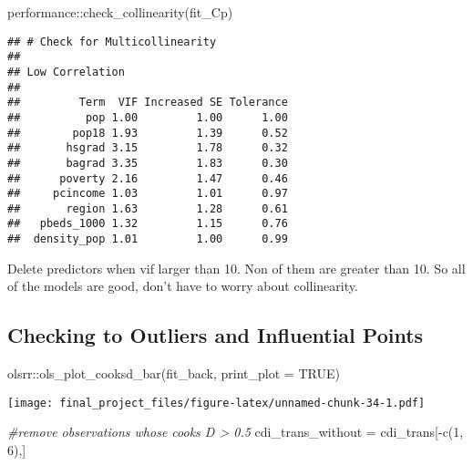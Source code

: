 \documentclass[
]{article}
\newenvironment{Shaded}{\begin{snugshade}}{\end{snugshade}}
\newcommand{\AttributeTok}[1]{\textcolor[rgb]{0.77,0.63,0.00}{#1}}
\newcommand{\CommentTok}[1]{\textcolor[rgb]{0.56,0.35,0.01}{\textit{#1}}}
\newcommand{\ConstantTok}[1]{\textcolor[rgb]{0.00,0.00,0.00}{#1}}
\newcommand{\DecValTok}[1]{\textcolor[rgb]{0.00,0.00,0.81}{#1}}
\newcommand{\FunctionTok}[1]{\textcolor[rgb]{0.00,0.00,0.00}{#1}}
\newcommand{\NormalTok}[1]{#1}
\newcommand{\OtherTok}[1]{\textcolor[rgb]{0.56,0.35,0.01}{#1}}
\newcommand{\SpecialCharTok}[1]{\textcolor[rgb]{0.00,0.00,0.00}{#1}}
\begin{document}
\begin{Shaded}
\begin{Highlighting}[]
\NormalTok{performance}\SpecialCharTok{::}\FunctionTok{check\_collinearity}\NormalTok{(fit\_Cp)}
\end{Highlighting}
\end{Shaded}

\begin{verbatim}
## # Check for Multicollinearity
## 
## Low Correlation
## 
##         Term  VIF Increased SE Tolerance
##          pop 1.00         1.00      1.00
##        pop18 1.93         1.39      0.52
##       hsgrad 3.15         1.78      0.32
##       bagrad 3.35         1.83      0.30
##      poverty 2.16         1.47      0.46
##     pcincome 1.03         1.01      0.97
##       region 1.63         1.28      0.61
##   pbeds_1000 1.32         1.15      0.76
##  density_pop 1.01         1.00      0.99
\end{verbatim}

Delete predictors when vif larger than 10. Non of them are greater than
10. So all of the models are good, don't have to worry about
collinearity.

\hypertarget{checking-to-outliers-and-influential-points}{%
\subsection{Checking to Outliers and Influential
Points}\label{checking-to-outliers-and-influential-points}}

\begin{Shaded}
\begin{Highlighting}[]
\NormalTok{olsrr}\SpecialCharTok{::}\FunctionTok{ols\_plot\_cooksd\_bar}\NormalTok{(fit\_back, }\AttributeTok{print\_plot =} \ConstantTok{TRUE}\NormalTok{)}
\end{Highlighting}
\end{Shaded}

\texttt{[image: final\_project\_files/figure-latex/unnamed-chunk-34-1.pdf]}

\begin{Shaded}
\begin{Highlighting}[]
\CommentTok{\#remove observations whose cook\textquotesingle{}s D \textgreater{} 0.5}
\NormalTok{cdi\_trans\_without }\OtherTok{=}\NormalTok{ cdi\_trans[}\SpecialCharTok{{-}}\FunctionTok{c}\NormalTok{(}\DecValTok{1}\NormalTok{, }\DecValTok{6}\NormalTok{),]}
\end{Highlighting}
\end{Shaded}
\end{document}
